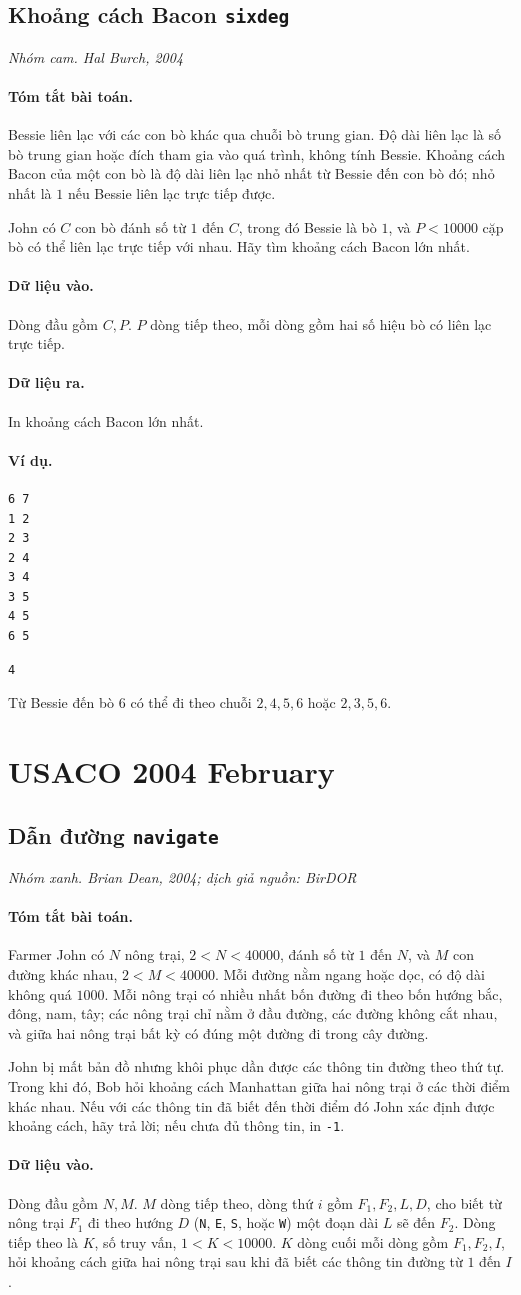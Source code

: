 \documentclass[11pt]{article}
\newcommand{\problem}[4]{%
  \subsection[#1 (#2)]{#1 \hfill {\normalsize\texttt{#2}}}%
  \noindent\textit{#3. #4}\par\smallskip
}
\newcommand{\iosec}[1]{\paragraph{#1}}
\begin{document}
\problem{Khoảng cách Bacon}{sixdeg}{Nhóm cam}{Hal Burch, 2004}

\iosec{Tóm tắt bài toán.}
Bessie liên lạc với các con bò khác qua chuỗi bò trung gian. Độ dài liên lạc
là số bò trung gian hoặc đích tham gia vào quá trình, không tính Bessie. Khoảng
cách Bacon của một con bò là độ dài liên lạc nhỏ nhất từ Bessie đến con bò đó;
nhỏ nhất là \(1\) nếu Bessie liên lạc trực tiếp được.

John có \(C\) con bò đánh số từ \(1\) đến \(C\), trong đó Bessie là bò \(1\),
và \(P<10000\) cặp bò có thể liên lạc trực tiếp với nhau. Hãy tìm khoảng cách
Bacon lớn nhất.

\iosec{Dữ liệu vào.}
Dòng đầu gồm \(C,P\). \(P\) dòng tiếp theo, mỗi dòng gồm hai số hiệu bò có
liên lạc trực tiếp.

\iosec{Dữ liệu ra.}
In khoảng cách Bacon lớn nhất.

\iosec{Ví dụ.}
\begin{verbatim}
6 7
1 2
2 3
2 4
3 4
3 5
4 5
6 5
\end{verbatim}

\begin{verbatim}
4
\end{verbatim}

Từ Bessie đến bò \(6\) có thể đi theo chuỗi \(2,4,5,6\) hoặc \(2,3,5,6\).

\section{USACO 2004 February}

\problem{Dẫn đường}{navigate}{Nhóm xanh}{Brian Dean, 2004; dịch giả nguồn: BirDOR}

\iosec{Tóm tắt bài toán.}
Farmer John có \(N\) nông trại, \(2<N<40000\), đánh số từ \(1\) đến \(N\), và
\(M\) con đường khác nhau, \(2<M<40000\). Mỗi đường nằm ngang hoặc dọc, có độ
dài không quá \(1000\). Mỗi nông trại có nhiều nhất bốn đường đi theo bốn
hướng bắc, đông, nam, tây; các nông trại chỉ nằm ở đầu đường, các đường không
cắt nhau, và giữa hai nông trại bất kỳ có đúng một đường đi trong cây đường.

John bị mất bản đồ nhưng khôi phục dần được các thông tin đường theo thứ tự.
Trong khi đó, Bob hỏi khoảng cách Manhattan giữa hai nông trại ở các thời
điểm khác nhau. Nếu với các thông tin đã biết đến thời điểm đó John xác định
được khoảng cách, hãy trả lời; nếu chưa đủ thông tin, in \texttt{-1}.

\iosec{Dữ liệu vào.}
Dòng đầu gồm \(N,M\). \(M\) dòng tiếp theo, dòng thứ \(i\) gồm
\(F_1,F_2,L,D\), cho biết từ nông trại \(F_1\) đi theo hướng \(D\)
(\texttt{N}, \texttt{E}, \texttt{S}, hoặc \texttt{W}) một đoạn dài \(L\) sẽ đến
\(F_2\). Dòng tiếp theo là \(K\), số truy vấn, \(1<K<10000\). \(K\) dòng cuối
mỗi dòng gồm \(F_1,F_2,I\), hỏi khoảng cách giữa hai nông trại sau khi đã biết
các thông tin đường từ \(1\) đến \(I\).
\end{document}
